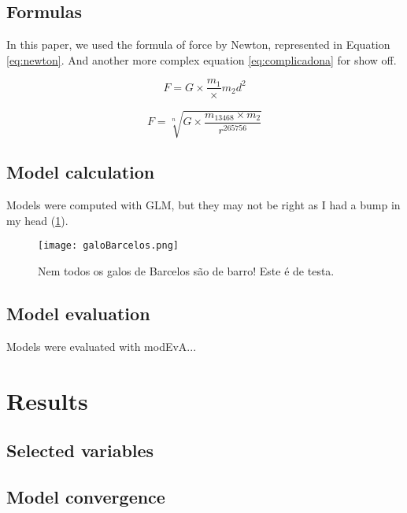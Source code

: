 \documentclass[12pt, a4paper]{article}
\begin{document}
\subsection{Formulas}

In this paper, we used the formula of force by Newton, represented in Equation \ref{eq:newton}. And another more complex equation \ref{eq:complicadona} for show off. 

\begin{equation}
F = G \times{ \frac{m_1} \times{m_2} {d^2}}
\label{eq:newton}
\end{equation}

\begin{equation}
    F = \sqrt[n]{G \times \frac{m_{13468} \times m_2}{r^{265756}}}
    \label{eq:complicadona}
\end{equation}


\subsection{Model calculation}

Models were computed with GLM, but they may not be right as I had a bump in my head (\ref{fig:galo}).

\begin{figure}
    \centering    \texttt{[image: galoBarcelos.png]}
    \caption{Nem todos os galos de Barcelos são de barro! Este é de testa.}
    \label{fig:galo}
\end{figure}


\subsection{Model evaluation}

Models were evaluated with modEvA...

\section{Results}

\subsection{Selected variables}

\subsection{Model convergence}
\end{document}
